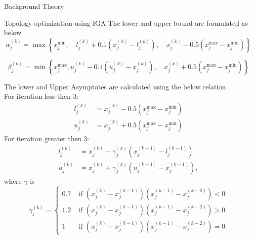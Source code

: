 \documentclass[a4paper,12pt,times]{article}
\begin{document}
\begin{section}{Background Theory}
\begin{subsection}{Topology optimization using IGA}
The lower and upper bound are formulated as below
\begin{equation}
\alpha_{j}^{(k)}=\max \left\{x_{j}^{\min }, \quad l_{j}^{(k)}+0.1\left(x_{j}^{(k)}-l_{j}^{(k)}\right), \quad x_{j}^{(k)}-0.5\left(x_{j}^{\max }-x_{j}^{\min }\right)\right\}
\end{equation}

\begin{equation}
\beta_{j}^{(k)}=\min \left\{x_{j}^{\max }, u_{j}^{(k)}-0.1\left(u_{j}^{(k)}-x_{j}^{(k)}\right), \quad x_{j}^{(k)}+0.5\left(x_{j}^{\max }-x_{j}^{\min }\right)\right\}
\end{equation}

The lower and Upper Asymptotes are calculated using the below relation \\
For iteration less then 3:
\begin{equation}
\begin{aligned}
l_{j}^{(k)} &=x_{j}^{(k)}-0.5\left(x_{j}^{\max }-x_{j}^{\min }\right) \\
u_{j}^{(k)} &=x_{j}^{(k)}+0.5\left(x_{j}^{\max }-x_{j}^{\min }\right)
\end{aligned}
\end{equation}
For iteration greater then 3:
\begin{equation}
\begin{aligned}
l_{j}^{(k)} &=x_{j}^{(k)}-\gamma_{j}^{(k)}\left(x_{j}^{(k-1)}-l_{j}^{(k-1)}\right) \\
u_{j}^{(k)} &=x_{j}^{(k)}+\gamma_{j}^{(k)}\left(u_{j}^{(k-1)}-x_{j}^{(k-1)}\right),
\end{aligned}
\end{equation}
where $\gamma$ is 
\begin{equation}
\gamma_{j}^{(k)}=\left\{\begin{array}{cl}
0.7 & \text { if }\left(x_{j}^{(k)}-x_{j}^{(k-1)}\right)\left(x_{j}^{(k-1)}-x_{j}^{(k-2)}\right)<0 \\
1.2 & \text { if }\left(x_{j}^{(k)}-x_{j}^{(k-1)}\right)\left(x_{j}^{(k-1)}-x_{j}^{(k-2)}\right)>0 \\
1 & \text { if }\left(x_{j}^{(k)}-x_{j}^{(k-1)}\right)\left(x_{j}^{(k-1)}-x_{j}^{(k-2)}\right)=0
\end{array}\right.
\end{equation}\\


\end{subsection}
\end{section}
\end{document}
